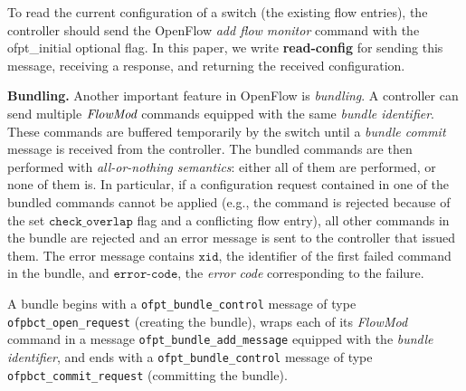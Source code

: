 \documentclass[conference]{sigcomm-alternate}
\newcommand{\hide}[1]{}
\newcommand{\FlowMod}{\emph{FlowMod}\xspace}
\newcommand{\checko}{\texttt{check\_overlap}\xspace}
\newcommand{\stefan}[1]{\textit{\textcolor{red}{[stefan]: #1}}} %
\newcommand{\xid}{\texttt{xid}}
\newcommand{\ecode}{\texttt{error-code}}
\begin{document}
To read the current configuration of a switch (the existing flow entries), the controller should send
the OpenFlow \emph{add flow monitor} command with the \textsf{ofpt\_initial} optional flag.
In this paper, we write \textbf{read-config} for sending
this message, receiving a response, and returning the received configuration.

\hide{
We also remark that our solution is only based on flow tables
and does not make use
of \emph{OpenFlow group tables}, nor do we make use of \emph{cookies}: rules
are always identified by exact matches.
}

\vspace{1mm}
\noindent\textbf{Bundling.}
%
Another important feature in OpenFlow is \emph{bundling}. %
A controller can send multiple $\FlowMod$ commands  equipped with
the same \emph{bundle identifier}.
These commands are buffered temporarily by
the switch until a \emph{bundle commit} message is received from the
controller.
The bundled commands are then performed with \emph{all-or-nothing semantics}:
either all of them are performed, or none of them is.
In particular, if a configuration request contained in one of the bundled commands cannot
be applied (e.g., the command is rejected because of the set
$\checko$ flag and a conflicting flow entry), all  other commands in
the bundle are rejected and an error
message is sent to the controller that issued them.
The error message contains $\xid$, the identifier of the first failed command in the
bundle, and $\ecode$, the \emph{error code} corresponding to the failure.

A bundle begins with a  \texttt{ofpt\_bundle\_control} message of type
\texttt{ofpbct\_open\_request} (creating the bundle), wraps
each of its \emph{FlowMod} command in a message
\texttt{ofpt\_bundle\_add\_message} equipped with the \emph{bundle
  identifier}, and ends with a \texttt{ofpt\_bundle\_control} message of
type \texttt{ofpbct\_commit\_request} (committing the bundle).

\end{document}
